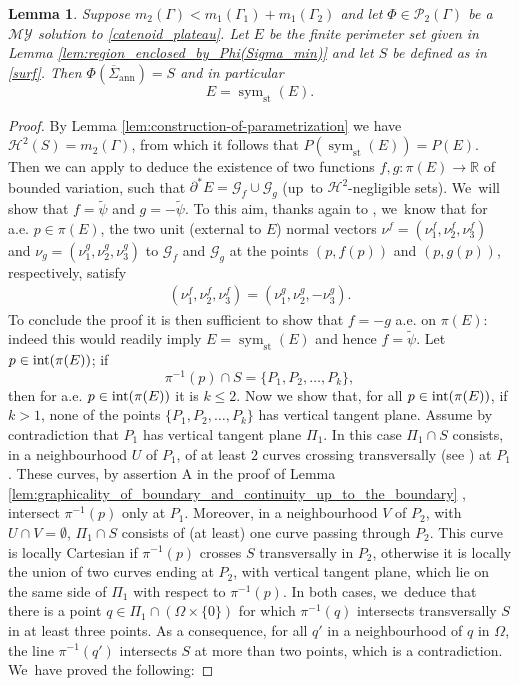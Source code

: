 \documentclass[JEP,XML,SOM,Unicode, NoFloatCountersInSection,published]{cedram}
\DeclareMathOperator{\sym}{sym}
\newcommand{\R}{\mathbb{R}}
\let\Om\Omega
\newcommand{\immclosedann}{\Phi({\overline\Sigma}_\mathrm{ann})}
\newtheorem{lemma}[theorem]{Lemma}
\theoremstyle{definition}
\begin{document}
\begin{lemma}\label{lemma_step5}
Suppose $m_2(\Gamma)<m_1(\Gamma_1)+m_1(\Gamma_2)$ and let $\Phi\in\mathcal{P}_2(\Gamma)$ be a $\mathcal{MY}$ solution to \eqref{catenoid_plateau}. Let $E$ be the finite perimeter set given in Lemma \ref{lem:region_enclosed_by_Phi(Sigma_min)} and let $S$ be defined as in \eqref{surf}. Then
$\immclosedann=S$
and in particular
\[
E=\sym_\mathrm{st}(E).
\]
\end{lemma}

\begin{proof} By Lemma \ref{lem:construction-of-parametrization} we have $\mathcal H^2(S)=m_2(\Gamma)$, from which it follows that
$P(\sym_\mathrm{st}(E))= P(E)$. Then we can apply \cite[Th.\,1.1]{CCF}
to deduce the existence of two functions
$f,g:\pi(E)\to \R$ of bounded variation, such that $\partial^* E=\mathcal G_f\cup\mathcal G_{g}$ (up~to $\mathcal H^2$-negligible sets). We~will show that $f=\widetilde\psi$ and $g=-\widetilde\psi$. To this aim,
thanks again to \cite[Th.\,1.1]{CCF}, we~know that for a.e. $p\in \pi(E)$, the two unit (external to $E$) normal
vectors $\nu^f=(\nu^f_1,\nu^f_2,\nu^f_3)$ and $\nu_g=(\nu^g_1,\nu^g_2,\nu^g_3)$ to $\mathcal G_f$ and $\mathcal G_g$ at the points $(p,f(p))$ and $(p,g(p))$, respectively, satisfy\enlargethispage{2pt}
\begin{align}\label{normals}
(\nu^f_1,\nu^f_2,\nu^f_3)=(\nu^g_1,\nu^g_2,-\nu^g_3).
\end{align}
To conclude the proof it is then sufficient to show that $f=-g$ a.e. on $\pi(E)$: indeed this would readily imply $E=\sym_\mathrm{st}(E)$ and hence $f=\widetilde\psi$.
Let $p\in \textup{int}(\pi(E))$; if
\begin{equation}
\pi^{-1}(p)\cap S=\{P_1,P_2,\dots,P_k\},
\end{equation}
then for a.e. $p\in \textup{int}(\pi(E))$ it is $k\leq2$.
Now we show that, for all $p\in \textup{int}(\pi(E))$, if $k>1$, none of the points $\{P_1,P_2,\dots,P_k\}$ has vertical tangent plane.
Assume by contradiction that $P_1$ has vertical tangent plane $\Pi_1$. In this case $\Pi_1\cap S$ consists, in a neighbourhood $U$ of $P_1$, of at least $2$ curves crossing {transversally} (see \cite[\S 373]{Nitsche:89}) at $P_1$. These curves, by assertion A in the proof of Lemma \ref{lem:graphicality_of_boundary_and_continuity_up_to_the_boundary} , intersect $\pi^{-1}(p)$ only at $P_1$. Moreover, in a neighbourhood $V$ of $P_2$, with $U\cap V=\emptyset$, $\Pi_1\cap S$ consists of (at least) one
curve passing through $P_2$. This curve is locally Cartesian if $\pi^{-1}(p)$ crosses $S$ transversally in $P_2$, otherwise it is
locally the union of two curves ending at $P_2$, with vertical tangent plane, which lie on the same side of $\Pi_1$ with respect to $\pi^{-1}(p)$. In both cases, we~deduce that there is a point $q\in \Pi_1\cap (\Om\times\{0\})$ for which $\pi^{-1}(q)$ intersects transversally $S$ in at least three points. As a consequence, for all $q'$ in a neighbourhood of $q$ in
$\Om$, the line $\pi^{-1}(q')$ intersects $S$ at more than two points, which is a contradiction. We~have proved the following:


\end{proof}
\end{document}
